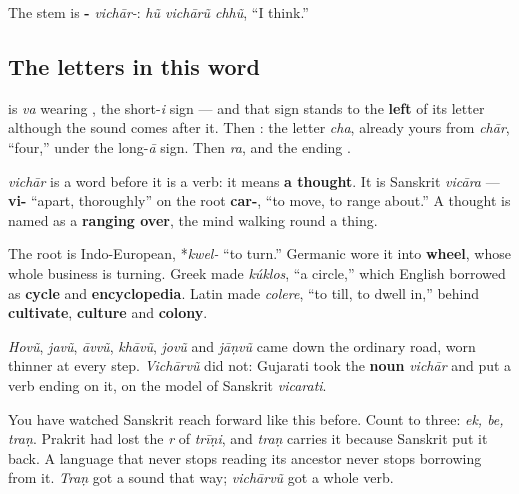 The stem is \textbf{-} \emph{vichār-}: \emph{hũ vichārũ chhũ}, \textquotedblleft{}I think.\textquotedblright{}

\subsection*{The letters in this word}
\textbf{} is \textbf{} \emph{va} wearing \textbf{}, the short-\emph{i} sign — and that sign stands to the \textbf{left} of its letter although the sound comes after it. Then \textbf{}: the letter \textbf{} \emph{cha}, already yours from \emph{chār}, \textquotedblleft{}four,\textquotedblright{} under the long-\emph{ā} sign. Then \textbf{} \emph{ra}, and the ending \textbf{}.

\begin{cousinweb}
\textbf{} \emph{vichār} is a word before it is a verb: it means \textbf{a thought}. It is Sanskrit \emph{vicāra} — \textbf{vi-} \textquotedblleft{}apart, thoroughly\textquotedblright{} on the root \textbf{car-}, \textquotedblleft{}to move, to range about.\textquotedblright{} A thought is named as a \textbf{ranging over}, the mind walking round a thing.

The root is Indo-European, *\emph{kwel-} \textquotedblleft{}to turn.\textquotedblright{} Germanic wore it into \textbf{wheel}, whose whole business is turning. Greek made \emph{kúklos}, \textquotedblleft{}a circle,\textquotedblright{} which English borrowed as \textbf{cycle} and \textbf{encyclopedia}. Latin made \emph{colere}, \textquotedblleft{}to till, to dwell in,\textquotedblright{} behind \textbf{cultivate}, \textbf{culture} and \textbf{colony}.
\end{cousinweb}

\begin{grammarlens}[title={What you've built: a verb Gujarati made rather than inherited}]
\emph{Hovũ}, \emph{javũ}, \emph{āvvũ}, \emph{khāvũ}, \emph{jovũ} and \emph{jāṇvũ} came down the ordinary road, worn thinner at every step. \emph{Vichārvũ} did not: Gujarati took the \textbf{noun} \emph{vichār} and put a verb ending on it, on the model of Sanskrit \emph{vicarati}.

You have watched Sanskrit reach forward like this before. Count to three: \emph{ek, be, traṇ}. Prakrit had lost the \emph{r} of \emph{trīṇi}, and \emph{traṇ} carries it because Sanskrit put it back. A language that never stops reading its ancestor never stops borrowing from it. \emph{Traṇ} got a sound that way; \emph{vichārvũ} got a whole verb.
\end{grammarlens}

